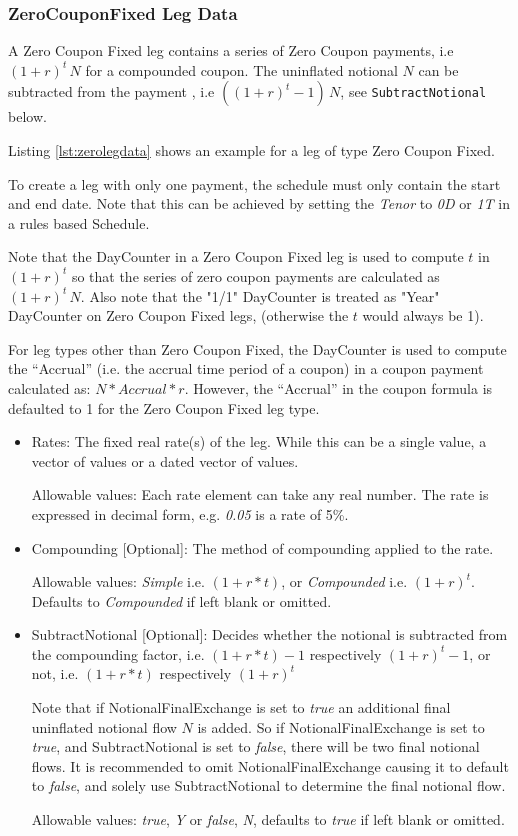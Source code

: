 \subsubsection{ZeroCouponFixed Leg Data}
\label{ss:zerolegdata}

A Zero Coupon Fixed leg contains a series of Zero Coupon payments, i.e $(1 + r)^t \,N$ for a compounded coupon. The uninflated notional $N$ can be subtracted from the payment , i.e $((1 + r)^t-1) \,N$, see \lstinline!SubtractNotional! below.

Listing \ref{lst:zerolegdata} shows an example for a leg of type Zero Coupon Fixed. 

To create a leg with only one payment, the schedule must only contain the start and end date. Note that this can be achieved by setting the \emph{Tenor} to \emph{0D} or \emph{1T}  in a rules based Schedule. 

Note that the DayCounter in a Zero Coupon Fixed leg is used to compute $t$ in $(1+r)^t$ so that the series of zero coupon payments are calculated as $(1 + r)^t \,N$. Also note that the "1/1" DayCounter is treated as "Year" DayCounter on Zero Coupon Fixed legs, (otherwise the $t$ would always be 1).

For leg types other than Zero Coupon Fixed, the DayCounter is used to compute the “Accrual” (i.e. the accrual time period of a coupon) in a coupon payment calculated as: $N * Accrual * r$. However, the “Accrual” in the coupon formula is defaulted to 1 for the Zero Coupon Fixed leg type.

\begin{itemize}
\item Rates: The fixed real rate(s) of the leg. While this can be a single value, a vector of values or a dated vector of
  values. 
 
 Allowable values: Each rate element can take any  real number. The rate is
  expressed in decimal form, e.g. \emph{0.05} is a rate of 5\%.
\item Compounding [Optional]:  The method of compounding applied to the rate.

Allowable values: \emph{Simple} i.e. $(1 + r * t)$, or \emph{Compounded} i.e. $(1 + r)^t$. Defaults to \emph{Compounded} if left blank or omitted. 


\item SubtractNotional [Optional]:  Decides whether the notional is
  subtracted from the compounding factor,  i.e. $(1 + r * t)  - 1$
  respectively  $(1 + r)^t - 1$, or not, i.e. $(1 + r * t)$  respectively  $(1 + r)^t$

Note that if NotionalFinalExchange is set to  \emph{true} an additional final uninflated notional flow $N$ is added. So if NotionalFinalExchange is set to \emph{true}, and SubtractNotional is set to \emph{false}, there will be two final notional flows. It is recommended to omit NotionalFinalExchange causing it to default to \emph{false}, and solely use SubtractNotional to determine the final notional flow.

Allowable values: \emph{true},  \emph{Y} or \emph{false}, \emph{N}, defaults to \emph{true} if left blank or omitted. 

\end{itemize}

